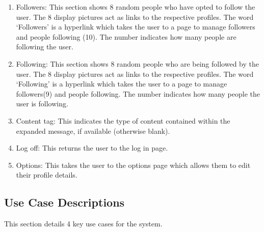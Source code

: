 \documentclass{sig-alt-release2}
\begin{document}
\begin{enumerate}
\item Followers: This section shows 8 random people who have opted to follow the user. The 8 display pictures act as links to the respective profiles. The word `Followers' is a hyperlink which takes the user to a page to manage followers and people following (10). The number indicates how many people are following the user.

\item Following: This section shows 8 random people who are being followed by the user. The 8 display pictures act as links to the respective profiles. The word `Following' is a hyperlink which takes the user to a page to manage followers(9) and people following. The number indicates how many people the user is following.

\item Content tag: This indicates the type of content contained within the expanded message, if available (otherwise blank).

\item Log off: This returns the user to the log in page.

\item Options: This takes the user to the options page which allows them to edit their profile details.

\end{enumerate}

\subsection{Use Case Descriptions}

This section details 4 key use cases for the system.
\end{document}
